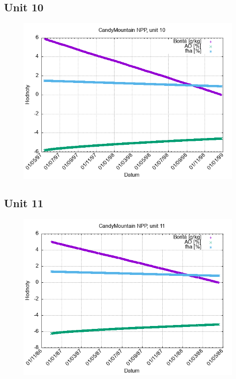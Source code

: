 \documentclass{article}
\begin{document}
\subsection*{Unit 10}
\begin{figure}[h!]
\centering
\includegraphics[width=14cm]{./grafy/CandyMountain10.png}
\end{figure}
\clearpage
\subsection*{Unit 11}
\begin{figure}[h!]
\centering
\includegraphics[width=14cm]{./grafy/CandyMountain11.png}
\end{figure}
\clearpage
\end{document}
